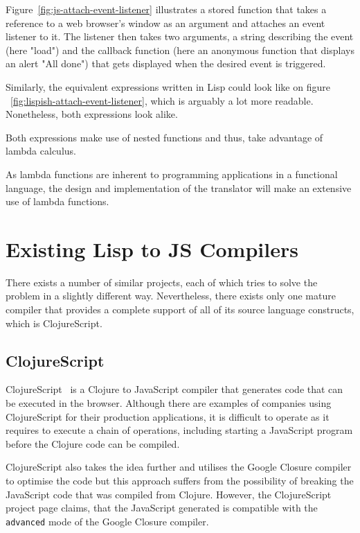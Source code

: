 

Figure~\ref{fig:js-attach-event-listener} illustrates a stored function that takes a reference to a web browser's window as an argument and attaches an event listener to it. The listener then takes two arguments, a string describing the event (here "load") and the callback function (here an anonymous function that displays an alert "All done") that gets displayed when the desired event is triggered.



Similarly, the equivalent expressions written in Lisp could look like on figure ~\ref{fig:lispish-attach-event-listener}, which is arguably a lot more readable. Nonetheless, both expressions look alike. 

Both expressions make use of nested functions and thus, take advantage of lambda calculus. 

As lambda functions are inherent to programming applications in a functional language, the design and implementation of the translator will make an extensive use of lambda functions.

\section{Existing Lisp to JS Compilers}\label{existing-implementations}
There exists a number of similar projects, each of which tries to solve the problem in a slightly different way. Nevertheless, there exists only one mature compiler that provides a complete support of all of its source language constructs, which is ClojureScript.

\subsection{ClojureScript}
ClojureScript~\cite{ClojureScript:2013:Site} is a Clojure to JavaScript compiler that generates code that can be executed in the browser. Although there are examples of companies using ClojureScript for their production applications, it is difficult to operate as it requires to execute a chain of operations, including starting a JavaScript program before the Clojure code can be compiled.

ClojureScript also takes the idea further and utilises the Google Closure compiler to optimise the code but this approach suffers from the possibility of breaking the JavaScript code that was compiled from Clojure. However, the ClojureScript project page claims, that the JavaScript generated is compatible with the \texttt{advanced} mode of the Google Closure compiler.

